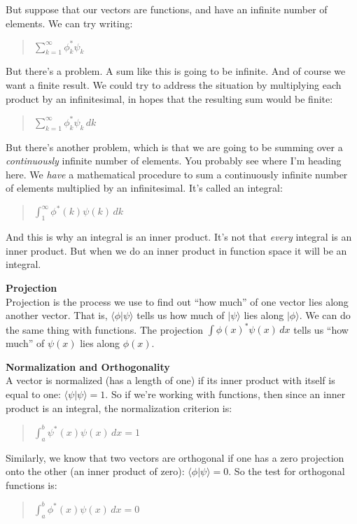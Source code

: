 \documentclass{article}
\def\ket#1{|#1\rangle}
\def\braket#1#2{\langle#1|#2\rangle}
\newcommand{\head}[1]{ \vspace{12pt} {\bf #1} \vspace{-12pt}\\ }
\begin{document}
But suppose that our vectors are functions, and have an infinite number
of elements. We can try writing:

\begin{quote}
$\displaystyle\sum^{\infty}_{k=1} \phi^*_k \psi_k$
\end{quote}

But there's a problem. A sum like this is going to be infinite.
And of course we want a finite result. We could try to address the situation
by multiplying each product by an infinitesimal, in hopes that the resulting
sum would be finite:

\begin{quote}
$\displaystyle\sum^{\infty}_{k=1} \phi^*_k \psi_k \, dk$
\end{quote}

But there's another problem, which is that we are going to be summing over
a {\it continuously} infinite number of elements. You probably see where I'm
heading here. We {\it have} a mathematical procedure to sum a continuously
infinite number of elements multiplied by an infinitesimal. It's called
an integral:

\begin{quote}
$\displaystyle\int^{\infty}_1 \phi^*(k) \psi(k) \, dk$
\end{quote}

And this is why an integral is an inner product. It's not that {\it every}
integral is an inner product. But when we do an inner product in function
space it will be an integral.

\head{Projection}

Projection is the process we use to find out ``how much'' of one vector
lies along another vector. That is, $\braket{\phi}{\psi}$ tells us how much
of $\ket{\psi}$ lies along $\ket{\phi}$.
We can do the same thing with functions.
The projection $\int\phi(x)^* \psi(x)\, dx$ tells us ``how much'' 
of $\psi(x)$ lies along $\phi(x)$. 

\head{Normalization and Orthogonality}

A vector is normalized (has a length of one) if its inner product with
itself is equal to one: $\braket{\psi}{\psi} = 1$. So if we're working
with functions, then since an inner product is an integral, the
normalization criterion is: 
\begin{quote}
$\displaystyle\int_a^b \psi^*(x) \psi(x) \, dx = 1$
\end{quote}

Similarly, we know that two vectors are orthogonal if one has a zero
projection onto the other (an inner product of zero):
$\braket{\phi}{\psi} = 0$. So the test for orthogonal functions is:
\begin{quote}
$\displaystyle\int_a^b \phi^*(x) \psi(x) \, dx = 0$
\end{quote}
\end{document}
